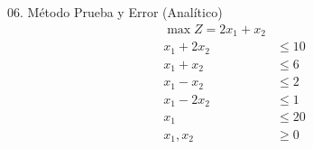 \begin{frameExample}{06. Método Prueba y Error (Analítico)}{}
    \begin{align*}
    \max Z = 2x_1 + x_2 & \\[5mm]
    x_1 + 2x_2 & \leq 10\\
    x_1 + x_2 & \leq 6\\
    x_1 - x_2 & \leq 2\\
    x_1 - 2x_2 & \leq 1\\
    x_1  & \leq 20 \\[5mm]
    x_1, x_2 & \geq 0
  \end{align*}
\end{frameExample}

